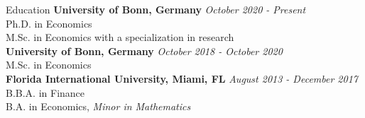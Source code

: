 \documentclass{resume}[10pt] %
\begin{document}
\footnotesize
\begin{rSection}{Education}
{\bf University of Bonn, Germany} \hfill {\em October 2020 - Present}
\\ Ph.D. in Economics\\
M.Sc. in Economics with a specialization in research \\

{\bf University of Bonn, Germany} \hfill {\em October 2018 - October 2020}
\\ M.Sc. in Economics\\

{\bf Florida International University, Miami, FL} \hfill {\em August 2013 - December 2017}
\\ B.B.A. in Finance
\\ B.A. in Economics, \textit{Minor in Mathematics}
\end{rSection}
\footnotesize
\end{document}
